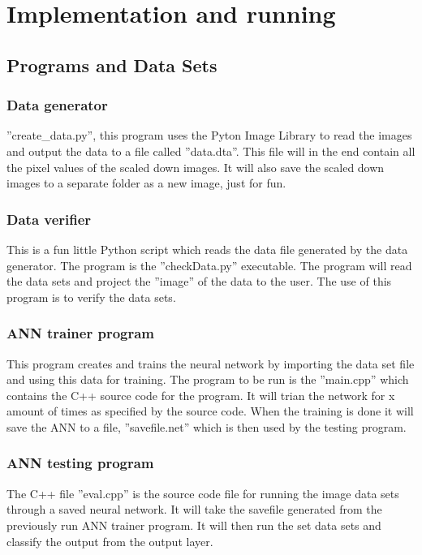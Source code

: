 \chapter{Implementation and running}

\section{Programs and Data Sets}
\subsection{Data generator}
''create\_data.py'', this program uses the Pyton Image Library to read the
images and output the data to a file called ''data.dta''. This file will in the
end contain all the pixel values of the scaled down images.  It will also save
the scaled down images to a separate folder as a new image, just for fun.

\subsection{Data verifier}
This is a fun little Python script which reads the data file generated by the
data generator.  The program is the ''checkData.py'' executable.  The program
will read the data sets and project the ''image'' of the data to the user. The
use of this program is to verify the data sets.

\subsection{ANN trainer program}
This program creates and trains the neural network by importing the data set
file and using this data for training. The program to be run is the ''main.cpp''
which contains the C++ source code for the program. It will trian the network
for x amount of times as specified by the source code. When the training is done
it will save the ANN to a file, ''savefile.net'' which is then used by the
testing program.

\subsection{ANN testing program}
The C++ file ''eval.cpp'' is the source code file for running the image data
sets through a saved neural network.  It will take the savefile generated from
the previously run ANN trainer program.  It will then run the set data sets and
classify the output from the output layer.


